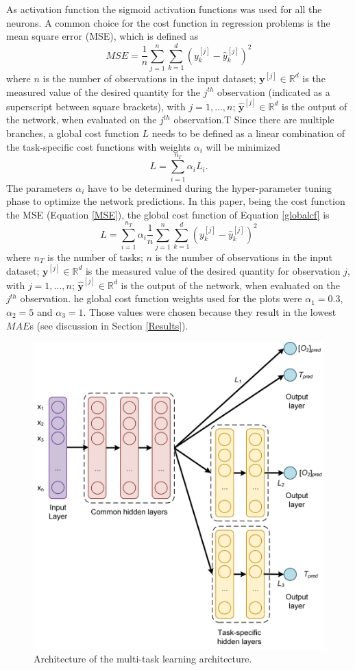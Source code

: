 \documentclass[9pt,twocolumn,twoside,pdftex]{optica}
\begin{document}
As activation function the sigmoid activation functions was used for all the neurons. A common choice for the cost function in regression problems is the mean square error (MSE), which is defined as
\begin{equation}
MSE = \frac{1}{n}\sum_{j=1}^n \sum_{k=1}^d (y_k^{[j]}-\hat y_k^{[j]})^2
\label{MSE}
\end{equation}
where $n$ is the number of observations in the input dataset; ${\mathbold y}^{[j]} \in \mathbb{R}^d$ is the measured value of the desired quantity for the $j^{th}$ observation (indicated as a superscript between square brackets), with $j=1, ..., n$; $ \hat {\mathbold y}^{[j]} \in \mathbb{R}^d$ is the output of the network, when evaluated on the $j^{th}$ observation.T Since there are multiple branches, a global cost function $L$ needs to be defined as a linear combination of the task-specific cost functions with weights $\alpha_i$ will be minimized
\begin{equation}
L = \sum_{i=1}^{n_T}\alpha_i L_i .
\label{globalcf}
\end{equation}
The parameters $\alpha_i$ have to be determined during the hyper-parameter tuning phase to optimize the network predictions.
In this paper, being the cost function the MSE (Equation \ref{MSE}), the global cost function of Equation \ref{globalcf} is
\begin{equation}
L = \sum_{i=1}^{n_T}\alpha_i \frac{1}{n}\sum_{j=1}^n \sum_{k=1}^d (y_k^{[j]}-\hat y_k^{[j]})^2
\end{equation}
where  $n_T$ is the number of tasks; $n$ is the number of observations in the input dataset; ${\mathbold y}^{[j]} \in \mathbb{R}^d$ is the measured value of the desired quantity for observation $j$, with $j=1, ..., n$; $ \hat {\mathbold y}^{[j]} \in \mathbb{R}^d$ is the output of the network, when evaluated on the $j^{th}$ observation.
he global cost function weights used for the plots were $\alpha_1 = 0.3$, $\alpha_2 = 5$ and $\alpha_3 = 1$. Those values were chosen because they result in the lowest $MAE$s (see discussion in Section \ref{Results}).
 
\begin{figure}[htbp]
\centering
\includegraphics[width=9 cm]{NN_MTL_O2_T.png}
\caption{Architecture of the multi-task learning architecture.}
\label{fig:NN_MTL_O2_T}
\end{figure}
\end{document}
